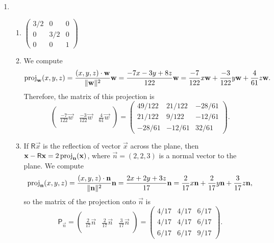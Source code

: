 \begin{enumerate}
\begin{enumerate}
\end{enumerate}
\item \begin{enumerate}
\item $\begin{pmatrix} 3/2 & 0 & 0 \\ 0 & 3/2 & 0 \\ 0 & 0 & 1 \end{pmatrix}$
\item We compute
\begin{equation*}
\operatorname{proj}_{\mathbf{w}}(x,y,z) = \frac{(x,y,z)\cdot\mathbf{w}}{\|\mathbf{w}\|^2}\mathbf{w} = \frac{-7x - 3y + 8z}{122}\mathbf{w} = \frac{-7}{122}x\mathbf{w} + \frac{-3}{122}y\mathbf{w} + \frac{4}{61}z\mathbf{w}.
\end{equation*}
Therefore, the matrix of this projection is
\begin{equation*}
\begin{pmatrix} {} & {} & {} \\ \frac{-7}{122}\vec{w} & \frac{-3}{122}\vec{w} & \frac{4}{61}\vec{w} \\ {} & {} & {} \end{pmatrix} = \begin{pmatrix} 49/122 & 21/122 & -28/61 \\ 21/122 & 9/122 & -12/61 \\ -28/61 & -12/61 & 32/61 \end{pmatrix}.
\end{equation*}
\item If $\mathsf{R}\vec{x}$ is the reflection of vector $\vec{x}$ across the plane, then $\mathbf{x} - \mathsf{R}\mathbf{x} = 2\operatorname{proj}_{\mathbf{n}}(\mathbf{x})$, where $\vec{n} = (2,2,3)$ is a normal vector to the plane. We compute
\begin{equation*}
\operatorname{proj}_{\mathbf{n}}(x,y,z) = \frac{(x,y,z)\cdot\mathbf{n}}{\|\mathbf{n}\|^2}\mathbf{n} = \frac{2x + 2y + 3z}{17}\mathbf{n} = \frac{2}{17}x\mathbf{n} + \frac{2}{17}y\mathbf{n} + \frac{3}{17}z\mathbf{n},
\end{equation*}
so the matrix of the projection onto $\vec{n}$ is
\begin{equation*}
\mathsf{P}_{\vec{n}} = \begin{pmatrix} {} & {} & {} \\ \frac{2}{17}\vec{n} & \frac{2}{17}\vec{n} & \frac{3}{17}\vec{n} \\ {} & {} & {} \end{pmatrix} = \begin{pmatrix} 4/17 & 4/17 & 6/17 \\ 4/17 & 4/17 & 6/17 \\ 6/17 & 6/17 & 9/17 \end{pmatrix}.

\end{equation*}
\end{enumerate}
\end{enumerate}
